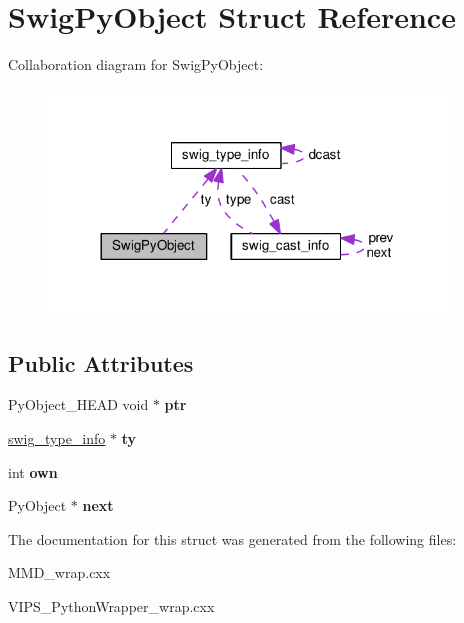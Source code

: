 \hypertarget{structSwigPyObject}{}\section{Swig\+Py\+Object Struct Reference}
\label{structSwigPyObject}


Collaboration diagram for Swig\+Py\+Object\+:\nopagebreak
\begin{figure}[H]
\begin{center}
\leavevmode
\includegraphics[width=300pt]{structSwigPyObject__coll__graph}
\end{center}
\end{figure}
\subsection*{Public Attributes}
\begin{DoxyCompactItemize}
\item 
Py\+Object\+\_\+\+H\+E\+AD void $\ast$ {\bfseries ptr}\hypertarget{structSwigPyObject_a96e168de04fa2da0125cf00f26ea6b9c}{}\label{structSwigPyObject_a96e168de04fa2da0125cf00f26ea6b9c}

\item 
\hyperlink{structswig__type__info}{swig\+\_\+type\+\_\+info} $\ast$ {\bfseries ty}\hypertarget{structSwigPyObject_a77f6f8357ce9c50f7c18c2a4ea72ea62}{}\label{structSwigPyObject_a77f6f8357ce9c50f7c18c2a4ea72ea62}

\item 
int {\bfseries own}\hypertarget{structSwigPyObject_a83cb6489fb1b171467f06c091ae6f283}{}\label{structSwigPyObject_a83cb6489fb1b171467f06c091ae6f283}

\item 
Py\+Object $\ast$ {\bfseries next}\hypertarget{structSwigPyObject_a6d423675e9561f658562d3d24f4f70d0}{}\label{structSwigPyObject_a6d423675e9561f658562d3d24f4f70d0}

\end{DoxyCompactItemize}


The documentation for this struct was generated from the following files\+:\begin{DoxyCompactItemize}
\item 
M\+M\+D\+\_\+wrap.\+cxx\item 
V\+I\+P\+S\+\_\+\+Python\+Wrapper\+\_\+wrap.\+cxx\end{DoxyCompactItemize}
